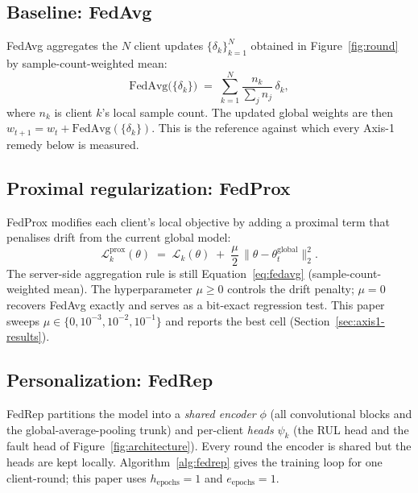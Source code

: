 \documentclass[preprint,12pt,authoryear]{elsarticle}
\begin{document}
\subsection{Baseline: FedAvg}
\label{subsec:fedavg}

FedAvg \citep{McMahan2017FedAvg} aggregates the $N$ client updates
$\{\delta_k\}_{k=1}^N$ obtained in Figure~\ref{fig:round} by
sample-count-weighted mean:
\begin{equation}
    \mathrm{FedAvg}\bigl(\{\delta_k\}\bigr)
    \;=\; \sum_{k=1}^{N} \frac{n_k}{\sum_{j} n_j}\, \delta_k,
    \label{eq:fedavg}
\end{equation}
where $n_k$ is client $k$'s local sample count. The updated global
weights are then $w_{t+1} = w_t + \mathrm{FedAvg}(\{\delta_k\})$.
This is the reference against which every Axis-1 remedy below is
measured.

\subsection{Proximal regularization: FedProx}
\label{subsec:fedprox}

FedProx \citep{Li2020FedProx} modifies each client's local
objective by adding a proximal term that penalises drift from the
current global model:
\begin{equation}
    \mathcal{L}_k^{\mathrm{prox}}(\theta)
    \;=\; \mathcal{L}_k(\theta)
    \;+\; \frac{\mu}{2}\, \bigl\| \theta - \theta_t^{\mathrm{global}} \bigr\|_2^2.
    \label{eq:fedprox}
\end{equation}
The server-side aggregation rule is still Equation~\eqref{eq:fedavg}
(sample-count-weighted mean). The hyperparameter $\mu \geq 0$
controls the drift penalty; $\mu = 0$ recovers FedAvg exactly and
serves as a bit-exact regression test. This paper sweeps
$\mu \in \{0, 10^{-3}, 10^{-2}, 10^{-1}\}$ and reports the best
cell (Section~\ref{sec:axis1-results}).

\subsection{Personalization: FedRep}
\label{subsec:fedrep}

FedRep \citep{Collins2021FedRep} partitions the model into a
\emph{shared encoder} $\phi$ (all convolutional blocks and the
global-average-pooling trunk) and per-client \emph{heads} $\psi_k$
(the RUL head and the fault head of
Figure~\ref{fig:architecture}). Every round the encoder is shared
but the heads are kept locally. Algorithm~\ref{alg:fedrep} gives
the training loop for one client-round; this paper uses
$h_{\mathrm{epochs}} = 1$ and $e_{\mathrm{epochs}} = 1$.
\end{document}
